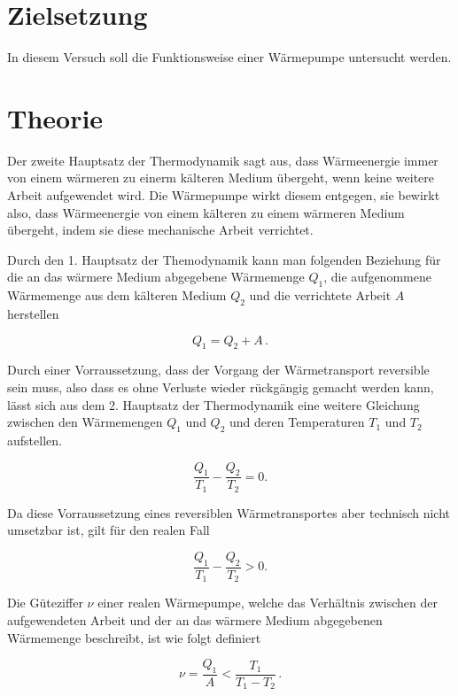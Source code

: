 \section{Zielsetzung}
In diesem Versuch soll die Funktionsweise einer Wärmepumpe untersucht werden.

\section{Theorie}
Der zweite Hauptsatz der Thermodynamik sagt aus, dass Wärmeenergie immer von einem wärmeren zu einerm kälteren Medium übergeht, wenn
keine weitere Arbeit aufgewendet wird. Die Wärmepumpe wirkt diesem entgegen, sie bewirkt also, dass Wärmeenergie von einem kälteren zu einem
wärmeren Medium übergeht, indem sie diese mechanische Arbeit verrichtet.

Durch den 1. Hauptsatz der Themodynamik kann man folgenden Beziehung für die an das wärmere Medium abgegebene Wärmemenge $Q_1$, die aufgenommene
Wärmemenge aus dem kälteren Medium $Q_2$  und die verrichtete Arbeit $A$ herstellen

\begin{equation*}
  \label{eq:1}
  Q_1 = Q_2 + A \, .
\end{equation*}

Durch einer Vorraussetzung, dass der Vorgang der Wärmetransport reversible sein muss, also dass es ohne Verluste wieder rückgängig gemacht
werden kann, lässt sich aus dem 2. Hauptsatz der Thermodynamik eine weitere Gleichung zwischen den Wärmemengen $Q_1$ und $Q_2$ und deren
Temperaturen $T_1$ und $T_2$ aufstellen.

\begin{equation}
  \label{eq:2}
  \frac{Q_1}{T_1} - \frac{Q_2}{T_2} = 0.
\end{equation}

Da diese Vorraussetzung eines reversiblen Wärmetransportes aber technisch nicht umsetzbar ist, gilt für den realen Fall

\begin{equation}
  \label{eq:3}
  \frac{Q_1}{T_1} - \frac{Q_2}{T_2} > 0.
\end{equation}

Die Güteziffer $\nu$ einer realen Wärmepumpe, welche das Verhältnis zwischen der aufgewendeten Arbeit und der an das wärmere Medium abgegebenen Wärmemenge beschreibt,
ist wie folgt definiert

\begin{equation}
  \label{eq:4}
  \nu = \frac{Q_1}{A} < \frac{T_1}{T_1 -T_2}\, .
\end{equation}

